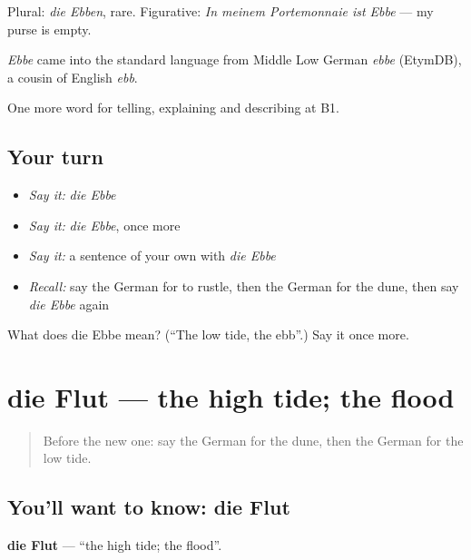 Plural: \emph{die Ebben}, rare. Figurative: \emph{In meinem Portemonnaie ist Ebbe} — my purse is empty.

\begin{cousinweb}
\emph{Ebbe} came into the standard language from Middle Low German \emph{ebbe} (EtymDB), a cousin of English \emph{ebb}.
\end{cousinweb}

\begin{grammarlens}[title={What you've built}]
One more word for telling, explaining and describing at B1.
\end{grammarlens}

\subsection*{Your turn}
\begin{itemize}
\raggedright
  \item \emph{Say it:} \emph{die Ebbe}
  \item \emph{Say it:} \emph{die Ebbe}, once more
  \item \emph{Say it:} a sentence of your own with \emph{die Ebbe}
  \item \emph{Recall:} say the German for to rustle, then the German for the dune, then say \emph{die Ebbe} again
\end{itemize}

\begin{tcolorbox}[breakable,colback=teal!4,colframe=teal!35!black,title={Before you move on}]
What does die Ebbe mean? (\textquotedblleft{}The low tide, the ebb\textquotedblright{}.) Say it once more.
\end{tcolorbox}
\section[die Flut]{die Flut — the high tide; the flood}

\label{lesson:GE-C457-flut}



\begin{quote}
Before the new one: say the German for the dune, then the German for the low tide.
\end{quote}

\subsection*{You'll want to know: die Flut}
\textbf{die Flut} — \textquotedblleft{}the high tide; the flood\textquotedblright{}.

